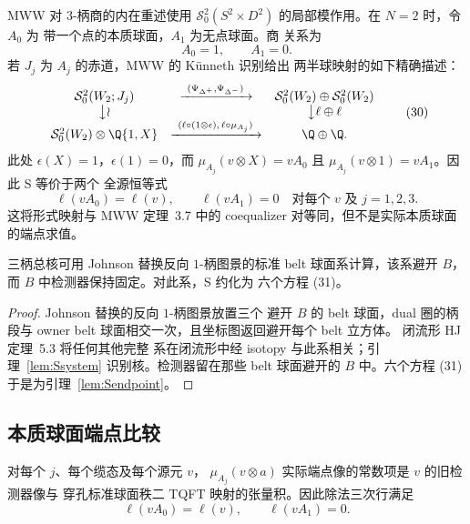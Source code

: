 MWW 对 $3$-柄商的内在重述使用
$\mathcal S^2_0(S^2\times D^2)$ 的局部模作用。在 $N=2$ 时，令 $A_0$ 为
带一个点的本质球面，$A_1$ 为无点球面。商
关系为
\[
A_0=1,\qquad A_1=0.
\]
若 $J_j$ 为 $A_j$ 的赤道，MWW 的 K\"unneth 识别给出
两半球映射的如下精确描述：
\[
\begin{array}{ccc}
\mathcal S^2_0(W_2;J_j)&\xrightarrow{\ (\Psi_{\Delta^+},\Psi_{\Delta^-})\ }&
\mathcal S^2_0(W_2)\oplus\mathcal S^2_0(W_2)\\
\big\downarrow\wr&&\big\downarrow{\ell\oplus\ell}\\
\mathcal S^2_0(W_2)\otimes\Q\{1,X\}
&\xrightarrow{\ (\ell\circ(1\otimes\epsilon),\,\ell\circ\mu_{A_j})\ }&
\Q\oplus\Q.
\end{array}
\tag{30}
\]
此处 $\epsilon(X)=1$，$\epsilon(1)=0$，而
$\mu_{A_j}(v\otimes X)=vA_0$ 且
$\mu_{A_j}(v\otimes1)=vA_1$。因此 S 等价于两个
全源恒等式
\[
\ell(vA_0)=\ell(v),\qquad \ell(vA_1)=0
\quad\text{对每个 }v\text{ 及 }j=1,2,3.
\tag{31}
\]
这将形式映射与 MWW
定理~3.7 中的 coequalizer 对等同，但不是实际本质球面的端点求值。

\begin{proposition}[固定检测器的球面替换]\label{thm:Sgeometry}
三柄总核可用 Johnson 替换反向 $1$-柄图景的标准 belt 球面系计算，该系避开
$B$，而 $B$ 中检测器保持固定。对此系，S 约化为
六个方程 (31)。
\end{proposition}

\begin{proof}
Johnson 替换的反向 $1$-柄图景放置三个
避开 $B$ 的 belt 球面，dual 圈的柄段与
owner belt 球面相交一次，且坐标图返回避开每个 belt 立方体。
闭流形 HJ 定理~5.3 将任何其他完整
系在闭流形中经 isotopy 与此系相关；引理~\ref{lem:Ssystem}
识别核。检测器留在那些 belt
球面避开的 $B$ 中。六个方程 (31) 于是为引理~\ref{lem:Sendpoint}。
\end{proof}

\subsection{本质球面端点比较}

\begin{lemma}[标准球面的端点分解]\label{lem:Sendpoint}
对每个 \(j\)、每个缆态及每个源元 \(v\)，
\(\mu_{A_j}(v\otimes a)\) 实际端点像的常数项是 \(v\) 的旧检测器像与
穿孔标准球面秩二 TQFT 映射的张量积。因此除法三次行满足
\[
\ell(vA_0)=\ell(v),\qquad \ell(vA_1)=0.
\]
\end{lemma}

